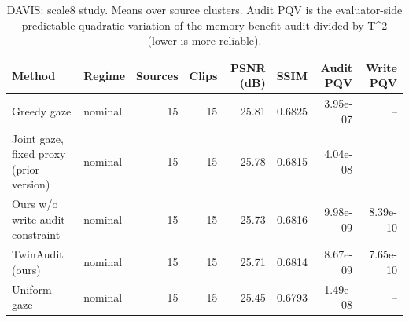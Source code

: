 \begin{table}[t]
\centering
\caption{DAVIS: scale8 study. Means over source clusters. Audit PQV is the evaluator-side predictable quadratic variation of the memory-benefit audit divided by T^2 (lower is more reliable).}
\label{tab:scale8_DAVIS}
\small
\begin{tabular}{llrrrrrr}
\toprule
Method & Regime & Sources & Clips & PSNR (dB) & SSIM & Audit PQV & Write PQV \\
\midrule
Greedy gaze & nominal & 15 & 15 & 25.81 & 0.6825 & 3.95e-07 & -- \\
Joint gaze, fixed proxy (prior version) & nominal & 15 & 15 & 25.78 & 0.6815 & 4.04e-08 & -- \\
Ours w/o write-audit constraint & nominal & 15 & 15 & 25.73 & 0.6816 & 9.98e-09 & 8.39e-10 \\
TwinAudit (ours) & nominal & 15 & 15 & 25.71 & 0.6814 & 8.67e-09 & 7.65e-10 \\
Uniform gaze & nominal & 15 & 15 & 25.45 & 0.6793 & 1.49e-08 & -- \\
\bottomrule
\end{tabular}
\end{table}

